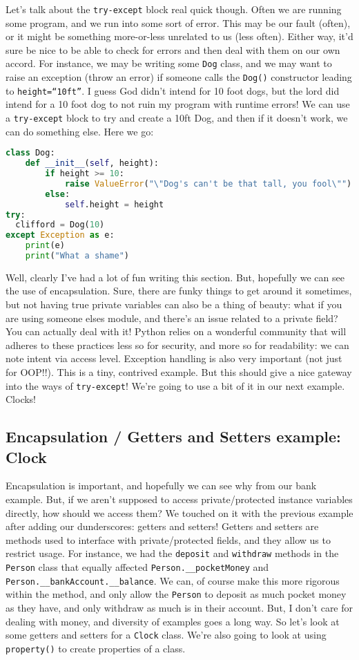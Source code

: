 \documentclass[11pt, twoside, reqno]{book}
\begin{document}
Let's talk about the \texttt{try-except} block real quick though. Often we are running some program, and we run into some sort of error. This may be our fault (often), or it might be something more-or-less unrelated to us (less often). Either way, it'd sure be nice to be able to check for errors and then deal with them on our own accord. For instance, we may be writing some \texttt{Dog} class, and we may want to raise an exception (throw an error) if someone calls the \texttt{Dog()} constructor leading to \texttt{height=``10ft''}. I guess God didn't intend for 10 foot dogs, but the lord did intend for a 10 foot dog to not ruin my program with runtime errors! We can use a \texttt{try-except} block to try and create a 10ft Dog, and then if it doesn't work, we can do something else. Here we go:
\begin{lstlisting}[language=Python]
class Dog:
    def __init__(self, height):
        if height >= 10:
            raise ValueError("\"Dog's can't be that tall, you fool\"")
        else:
            self.height = height
try:
  clifford = Dog(10)
except Exception as e:
    print(e)
    print("What a shame")
\end{lstlisting}

Well, clearly I've had a lot of fun writing this section. But, hopefully we can see the use of encapsulation. Sure, there are funky things to get around it sometimes, but not having true private variables can also be a thing of beauty: what if you are using someone elses module, and there's an issue related to a private field? You can actually deal with it! Python relies on a wonderful community that will adheres to these practices less so for security, and more so for readability: we can note intent via access level. Exception handling is also very important (not just for OOP!!). This is a tiny, contrived example. But this should give a nice gateway into the ways of \texttt{try-except}! We're going to use a bit of it in our next example. Clocks!

\subsection{Encapsulation / Getters and Setters example: Clock}

Encapsulation is important, and hopefully we can see why from our bank example. But, if we aren't supposed to access private/protected instance variables directly, how should we access them? We touched on it with the previous example after adding our dunderscores: getters and setters! Getters and setters are methods used to interface with private/protected fields, and they allow us to restrict usage. For instance, we had the \texttt{deposit} and \texttt{withdraw} methods in the \texttt{Person} class that equally affected \texttt{Person.\_\_pocketMoney} and \texttt{Person.\_\_bankAccount.\_\_balance}. We can, of course make this more rigorous within the method, and only allow the \texttt{Person} to deposit as much pocket money as they have, and only withdraw as much is in their account. But, I don't care for dealing with money, and diversity of examples goes a long way. So let's look at some getters and setters for a \texttt{Clock} class. We're also going to look at using \texttt{property()} to create properties of a class.
\end{document}
